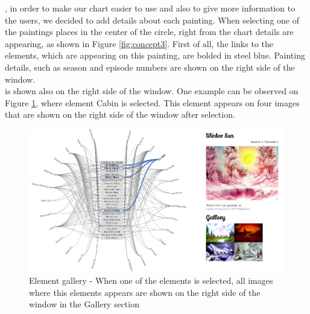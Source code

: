 \documentclass[a4paper]{tufte-book}
\begin{document}
, in order to make our chart easier to use and also to give more information to the users, we decided to add details about each painting. When selecting one of the paintings places in the center of the circle, right from the chart details are appearing, as shown in Figure \ref{fig:concept3}. First of all, the links to the elements, which are appearing on this painting, are bolded in steel blue. Painting details, such as season and episode numbers are shown on the right side of the window.  \\

 is shown also on the right side of the window. One example can be observed on Figure  \ref{fig:concept4}, where element Cabin is selected. This element appears on four images that are shown on the right side of the window after selection. \\

\begin{figure}[!h]
	\includegraphics{Images/elementGallery.png}
	\caption{Element gallery - When one of the elements is selected, all images where this elements appears are shown on the right side of the window in the Gallery section}
	\label{fig:concept4}
\end{figure}
\end{document}
